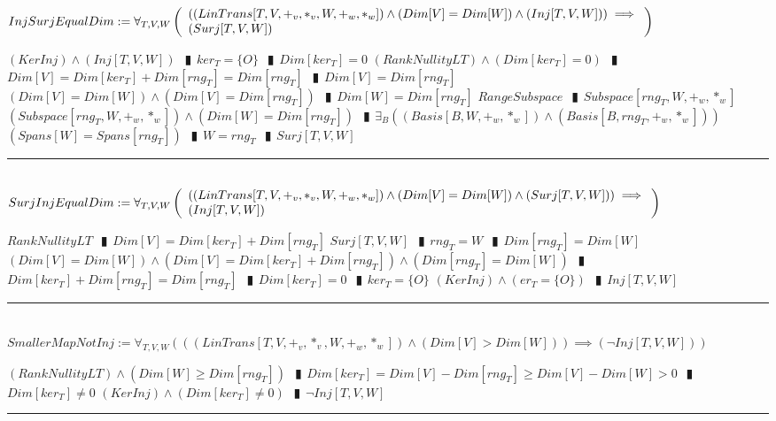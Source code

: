\documentclass{book}
\newcommand{\abr}{:=}
\newcommand{\pipe}{$\phantom{(}\vrectangleblack\phantom{)}$}
\begin{document}
$InjSurjEqualDim \abr \forall_{T, V, W}\left(\begin{array}{ll}
  ((LinTrans[T, V, +_v, *_v, W, +_w, *_w]) \land (Dim[V] = Dim[W]) \land (Inj[T, V, W])) \hfill \implies \hfill \\
  (Surj[T, V, W])
\end{array}\right)$
\begin{enumerate}
  \lit $(KerInj) \land (Inj[T, V, W])$ \pipe $ker_T = \{O\}$ \pipe $Dim[ker_T] = 0$
  \lit $(RankNullityLT) \land (Dim[ker_T] = 0)$ \pipe $Dim[V] = Dim[ker_T] + Dim[rng_T] = Dim[rng_T]$ \pipe $Dim[V] = Dim[rng_T]$
  \lit $(Dim[V] = Dim[W]) \land (Dim[V] = Dim[rng_T])$ \pipe $Dim[W] = Dim[rng_T]$
  \lit $RangeSubspace$ \pipe $Subspace[rng_T, W, +_w, *_w]$
  \lit $(Subspace[rng_T, W, +_w, *_w]) \land (Dim[W] = Dim[rng_T])$ \pipe $\exists_{B}((Basis[B, W, +_w, *_w]) \land (Basis[B, rng_T, +_w, *_w]))$
  \lit $(Spans[W] = Spans[rng_T])$ \pipe $W = rng_T$ \pipe $Surj[T, V, W]$
\end{enumerate} \vspace{.75mm} \hrule \vspace{.75mm} \ \\ 

$SurjInjEqualDim \abr \forall_{T, V, W}\left(\begin{array}{ll}
  ((LinTrans[T, V, +_v, *_v, W, +_w, *_w]) \land (Dim[V] = Dim[W]) \land (Surj[T, V, W])) \hfill \implies \hfill \\
  (Inj[T, V, W])
\end{array}\right)$
\begin{enumerate}
  \lit $RankNullityLT$ \pipe $Dim[V] = Dim[ker_T] + Dim[rng_T]$
  \lit $Surj[T, V, W]$ \pipe $rng_T = W$ \pipe $Dim[rng_T] = Dim[W]$
  \lit $(Dim[V] = Dim[W]) \land (Dim[V] = Dim[ker_T] + Dim[rng_T]) \land (Dim[rng_T] = Dim[W])$ \pipe $Dim[ker_T] + Dim[rng_T] = Dim[rng_T]$ \pipe $Dim[ker_T] = 0$ \pipe $ker_T = \{O\}$
  \lit $(KerInj) \land (er_T = \{O\})$ \pipe $Inj[T, V, W]$
\end{enumerate} \vspace{.75mm} \hrule \vspace{.75mm} \ \\ 

$SmallerMapNotInj \abr \forall_{T, V, W}(((LinTrans[T, V, +_v, *_v, W, +_w, *_w]) \land (Dim[V] > Dim[W])) \implies (\lnot Inj[T, V, W]))$
\begin{enumerate}
  \lit $(RankNullityLT) \land (Dim[W] \geq Dim[rng_T])$ \pipe $Dim[ker_T] = Dim[V] - Dim[rng_T] \geq Dim[V] - Dim[W] > 0$ \pipe $Dim[ker_T] \neq 0$
  \lit $(KerInj) \land (Dim[ker_T] \neq 0)$ \pipe $\lnot Inj[T, V, W]$
\end{enumerate} \vspace{.75mm} \hrule \vspace{.75mm} \ \\ 
\end{document}
